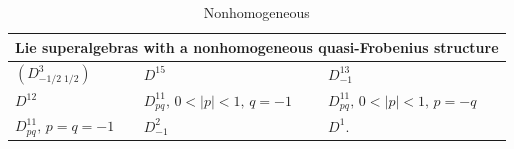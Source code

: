 \documentclass[12pt]{amsart}
\begin{document}
\begin{table}[ht]
\centering
\renewcommand{\arraystretch}{1.2}
\begin{tabular}{lll}
\hline
\multicolumn{3}{c}{Lie superalgebras with a {\bf nonhomogeneous} quasi-Frobenius structure} \\
\hline
$(D^3_{-1/2\; 1/2})$ &  $D^{15}$&  $D^{13}_{-1}$\\[2mm] $D^{12}$ &  $D^{11}_{pq}, \, 0<|p|<1,\, q=-1$&  $D^{11}_{pq}, \, 0<|p|<1,\, p=-q$\\[2mm] 
$D^{11}_{pq}, \, p=q=-1$ & $D^{2}_{-1}$& $D^{1}$. \\
\hline
\end{tabular}
\caption{Nonhomogeneous}
\label{tab:NHQF}
\end{table}
\end{document}
